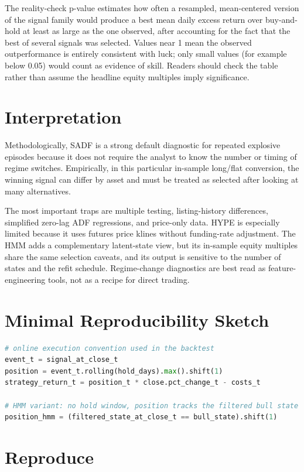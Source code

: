 \documentclass[11pt]{article}
\begin{document}
The reality-check p-value estimates how often a resampled, mean-centered version of the signal family would produce a best mean daily excess return over buy-and-hold at least as large as the one observed, after accounting for the fact that the best of several signals was selected. Values near 1 mean the observed outperformance is entirely consistent with luck; only small values (for example below 0.05) would count as evidence of skill. Readers should check the table rather than assume the headline equity multiples imply significance.

\section{Interpretation}

Methodologically, SADF is a strong default diagnostic for repeated explosive episodes because it does not require the analyst to know the number or timing of regime switches. Empirically, in this particular in-sample long/flat conversion, the winning signal can differ by asset and must be treated as selected after looking at many alternatives.

The most important traps are multiple testing, listing-history differences, simplified zero-lag ADF regressions, and price-only data. HYPE is especially limited because it uses futures price klines without funding-rate adjustment. The HMM adds a complementary latent-state view, but its in-sample equity multiples share the same selection caveats, and its output is sensitive to the number of states and the refit schedule. Regime-change diagnostics are best read as feature-engineering tools, not as a recipe for direct trading.

\section{Minimal Reproducibility Sketch}

\begin{lstlisting}[language=Python]
# online execution convention used in the backtest
event_t = signal_at_close_t
position = event_t.rolling(hold_days).max().shift(1)
strategy_return_t = position_t * close.pct_change_t - costs_t

# HMM variant: no hold window, position tracks the filtered bull state
position_hmm = (filtered_state_at_close_t == bull_state).shift(1)
\end{lstlisting}

\section{Reproduce}
\end{document}
